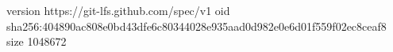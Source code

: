 version https://git-lfs.github.com/spec/v1
oid sha256:404890ac808e0bd43dfe6c80344028e935aad0d982e0e6d01f559f02ec8ceaf8
size 1048672
